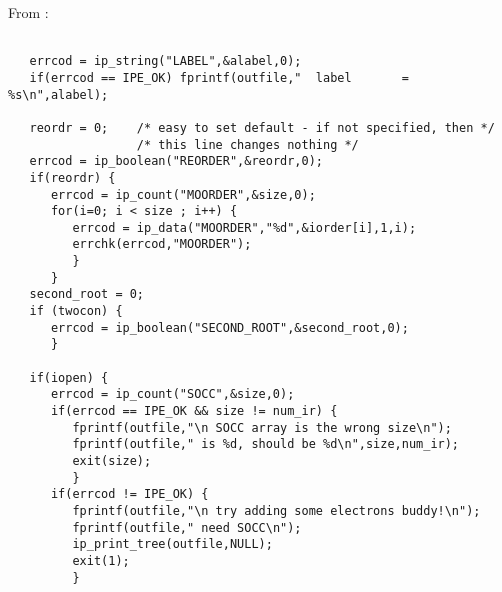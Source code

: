 From :
\begin{verbatim}

   errcod = ip_string("LABEL",&alabel,0);
   if(errcod == IPE_OK) fprintf(outfile,"  label       = %s\n",alabel);

   reordr = 0;    /* easy to set default - if not specified, then */
                  /* this line changes nothing */
   errcod = ip_boolean("REORDER",&reordr,0); 
   if(reordr) {
      errcod = ip_count("MOORDER",&size,0);
      for(i=0; i < size ; i++) {
         errcod = ip_data("MOORDER","%d",&iorder[i],1,i);
         errchk(errcod,"MOORDER");
         }
      }
   second_root = 0;
   if (twocon) {
      errcod = ip_boolean("SECOND_ROOT",&second_root,0);
      }

   if(iopen) {
      errcod = ip_count("SOCC",&size,0);
      if(errcod == IPE_OK && size != num_ir) {
         fprintf(outfile,"\n SOCC array is the wrong size\n");
         fprintf(outfile," is %d, should be %d\n",size,num_ir);
         exit(size);
         }
      if(errcod != IPE_OK) {
         fprintf(outfile,"\n try adding some electrons buddy!\n");
         fprintf(outfile," need SOCC\n");
         ip_print_tree(outfile,NULL);
         exit(1);
         }
\end{verbatim}
